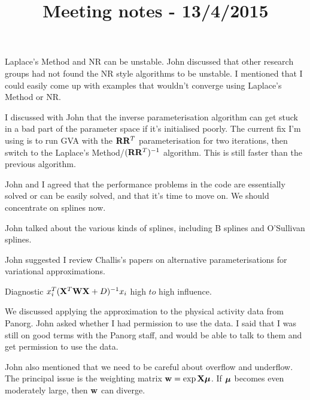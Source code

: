 \documentclass{article}[12pt]
\title{Meeting notes - 13/4/2015}
\begin{document}
Laplace's Method and NR can be unstable. John discussed that other research
groups had not found the NR style algorithms to be unstable. I mentioned that I
could easily come up with examples that wouldn't converge using Laplace's Method
or NR.

I discussed with John that the inverse parameterisation algorithm can get stuck
in a bad part of the parameter space if it's initialised poorly. The current fix
I'm using is to run GVA with the ${\bf R} {\bf R}^T$ parameterisation for two
iterations, then switch to the Laplace's Method/$({\bf R} {\bf R}^T)^{-1}$ algorithm.
This is still faster than the previous algorithm.

John and I agreed that the performance problems in the code are essentially
solved or can be easily solved, and that it's time to move on. We should
concentrate on splines now.

John talked about the various kinds of splines, including B splines and
O'Sullivan splines.

John suggested I review Challis's papers on alternative parameterisations
for variational approximations.

Diagnostic $x_i^T ({\bf X}^T {\bf W} {\bf X} + D)^{-1} x_i$ high $to$ high influence.

We discussed applying the approximation to the physical activity data
from Panorg. John asked whether I had permission to use the data. I said
that I was still on good terms with the Panorg staff, and would be able to
talk to them and get permission to use the data.

John also mentioned that we need to be careful about overflow and underflow.
The principal issue is the weighting matrix ${\bf w} = \exp{{\bf X}{\boldsymbol\mu}}$. If ${\boldsymbol \mu}$
becomes even moderately large, then ${\bf w}$ can diverge.
\end{document}
